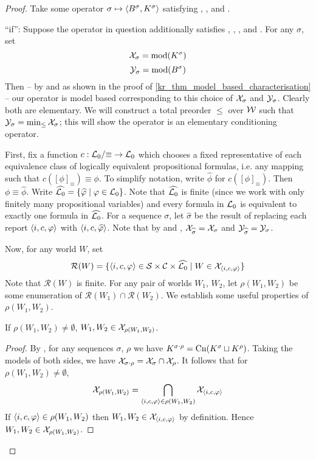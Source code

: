\begin{proof}

Take some operator $\sigma \mapsto \langle {B^\sigma, K^\sigma} \rangle$ satisfying
\closure{}, \containment{}, \kconj{} and
\equivpost{}.

``if'': Suppose the operator in question additionally satisfies
\rearr{}, \duprem{}, \condcons{},
\incvac{} and \acyc{}. For any $\sigma$, set
%
\[ \mathcal{X}_\sigma = \operatorname{mod}(K^\sigma) \] \[ \mathcal{Y}_\sigma = \operatorname{mod}(B^\sigma) \]
%
Then -- by \closure{} and \containment{} as shown in the proof of
\cref{kr_thm_model_based_characterisation} -- our operator is model based
corresponding to this choice of $\mathcal{X}_\sigma$ and $\mathcal{Y}_\sigma$. Clearly both are
elementary. We will construct a total preorder $\le$ over $\mathcal{W}$ such that
$\mathcal{Y}_\sigma = \min_{\le}{\mathcal{X}_\sigma}$; this will show the operator is an
elementary conditioning operator.

First, fix a function $c: \mathcal{L}{}_0 / {\equiv} \to \mathcal{L}{}_0$ which chooses a fixed
representative of each equivalence class of logically equivalent propositional
formulas, i.e. any mapping such that $c([\phi]_{\equiv}) \equiv \phi$. To
simplify notation, write $\widehat{\phi}$ for $c([\phi]_{\equiv})$. Then $\phi
\equiv \widehat{\phi}$. Write $\widehat{\mathcal{L}{}_0} = \{\widehat{\varphi} \mid \varphi
\in \mathcal{L}{}_0\}$.  Note that $\widehat{\mathcal{L}{}_0}$ is finite (since we work with only
finitely many propositional variables) and every formula in $\mathcal{L}{}_0$ is
equivalent to exactly one formula in $\widehat{\mathcal{L}{}_0}$. For a sequence
$\sigma$, let $\widehat{\sigma}$ be the result of replacing each report
$\langle {i, c, \varphi} \rangle$ with $\langle {i, c, \widehat{\varphi}} \rangle$. Note that by
\rearr{} and \equivpost{}, $\mathcal{X}_{\widehat{\sigma}} =
\mathcal{X}_\sigma$ and $\mathcal{Y}_{\widehat{\sigma}} = \mathcal{Y}_\sigma$.

Now, for any world $W$, set
\newcommand{\reports}{\mathcal{R}}
\[
    \reports(W)
    = \{
        \tuple{i, c, \phi}
        \in \srcs \times \C \times \widehat{\lprop}
        \mid
        W \in \X_{\tuple{i, c, \phi}}
    \}
\]
Note that $\reports(W)$ is finite. For any pair of worlds $W_1$, $W_2$, let
$\rho(W_1, W_2)$ be some enumeration of $\reports(W_1) \cap \reports(W_2)$. We
establish some useful properties of $\rho(W_1, W_2)$.

    \begin{claim}
        \label{kr_claim_w_j_in_rho}
        If $\rho(W_1, W_2) \ne \emptyset$, $W_1, W_2 \in \mathcal{X}_{\rho(W_1, W_2)}$.
    \end{claim}
    \begin{proof}
        By \kconj{}, for any sequences $\sigma$, $\rho$ we have
        $K^{\sigma \cdot \rho} = \operatorname{Cn}(K^\sigma \sqcup K^\rho)$.  Taking the
        models of both sides, we have $\mathcal{X}_{\sigma \cdot \rho} = \mathcal{X}_\sigma
        \cap \mathcal{X}_\rho$. It follows that for $\rho(W_1, W_2) \ne \emptyset$,
        \[
            \mathcal{X}_{\rho(W_1, W_2)}
            = \bigcap_{\langle {i, c, \varphi} \rangle \in \rho(W_1, W_2)}{\mathcal{X}_{\langle {i, c,
            \varphi} \rangle}}
        \]
        If $\langle {i, c, \varphi} \rangle \in \rho(W_1, W_2)$ then $W_1, W_2 \in
        \mathcal{X}_{\langle {i, c, \varphi} \rangle}$ by definition. Hence $W_1, W_2 \in
        \mathcal{X}_{\rho(W_1, W_2)}$.
    \end{proof}


\end{proof}
